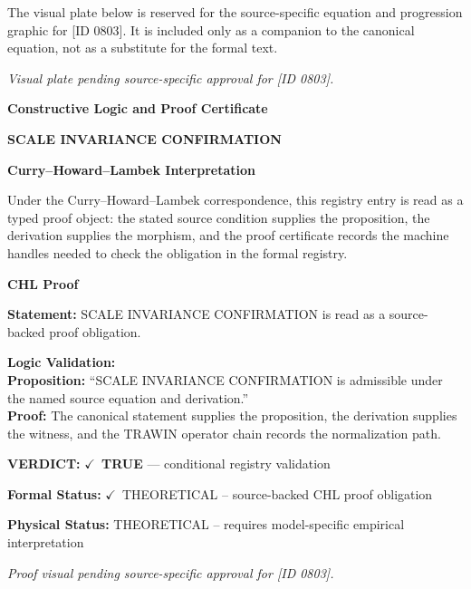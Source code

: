 \begingroup\footnotesize\sloppy
The visual plate below is reserved for the source-specific equation and progression graphic for [ID 0803]. It is included only as a companion to the canonical equation, not as a substitute for the formal text.
\par\endgroup
\begingroup\footnotesize\itshape
Visual plate pending source-specific approval for [ID 0803].
\par\endgroup

\clearpage
\begingroup\tzpsupportsetup
\noindent\textbf{\fontsize{10.8pt}{12.8pt}\selectfont [ID 0803] Constructive Logic and Proof Certificate}\par
\noindent\textbf{\fontsize{10pt}{12pt}\selectfont SCALE INVARIANCE CONFIRMATION}\par
\vspace{0.45em}
\begingroup
\footnotesize
\setlength{\parskip}{0.22em}
\setlength{\parindent}{0pt}
\noindent\textbf{Curry--Howard--Lambek Interpretation}\par
Under the Curry--Howard--Lambek correspondence, this registry entry is read as a typed proof
object: the stated source condition supplies the proposition, the derivation supplies the
morphism, and the proof certificate records the machine handles needed to check the obligation
in the formal registry.

\vspace{0.45em}
\noindent\textbf{CHL Proof}\par
\textbf{Statement:} SCALE INVARIANCE CONFIRMATION is read as a source-backed proof obligation.

\textbf{Logic Validation:}\\
\textbf{Proposition:} ``SCALE INVARIANCE CONFIRMATION is admissible under the named source equation and derivation.''\\
\textbf{Proof:} The canonical statement supplies the proposition, the derivation supplies the witness, and the TRAWIN operator chain records the normalization path.

\textbf{VERDICT:} \ensuremath{\checkmark}\ \textbf{TRUE} --- conditional registry validation

\textbf{Formal Status:} \ensuremath{\checkmark}\ THEORETICAL -- source-backed CHL proof obligation

\textbf{Physical Status:} THEORETICAL -- requires model-specific empirical interpretation
\par\vspace{0.45em}
\par
\vfill
\begingroup\footnotesize\itshape
Proof visual pending source-specific approval for [ID 0803].
\par\endgroup
\vfill
\endgroup
\endgroup
